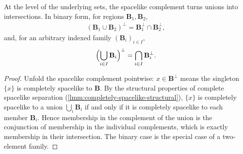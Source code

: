\begin{lemma}
    \label{lmm:spacelike-complement-de-morgan}
    \leanok
    At the level of the underlying sets, the spacelike complement turns unions into intersections. In binary form, for regions $\mathbf{B}_1, \mathbf{B}_2$,
    \begin{align}
        (\mathbf{B}_1 \cup \mathbf{B}_2)^\perp = \mathbf{B}_1^\perp \cap \mathbf{B}_2^\perp,
    \end{align}
    and, for an arbitrary indexed family $(\mathbf{B}_i)_{i \in I}$,
    \begin{align}
        \Bigl(\bigcup_{i \in I} \mathbf{B}_i\Bigr)^\perp = \bigcap_{i \in I} \mathbf{B}_i^\perp.
    \end{align}
\end{lemma}
\begin{proof}
    \leanok
    Unfold the spacelike complement pointwise: $x \in \mathbf{B}^\perp$ means the singleton $\{x\}$ is completely spacelike to $\mathbf{B}$. By the structural properties of complete spacelike separation (\ref{lmm:completely-spacelike-structural}), $\{x\}$ is completely spacelike to a union $\bigcup_i \mathbf{B}_i$ if and only if it is completely spacelike to each member $\mathbf{B}_i$. Hence membership in the complement of the union is the conjunction of membership in the individual complements, which is exactly membership in their intersection. The binary case is the special case of a two-element family.
\end{proof}

\medskip


